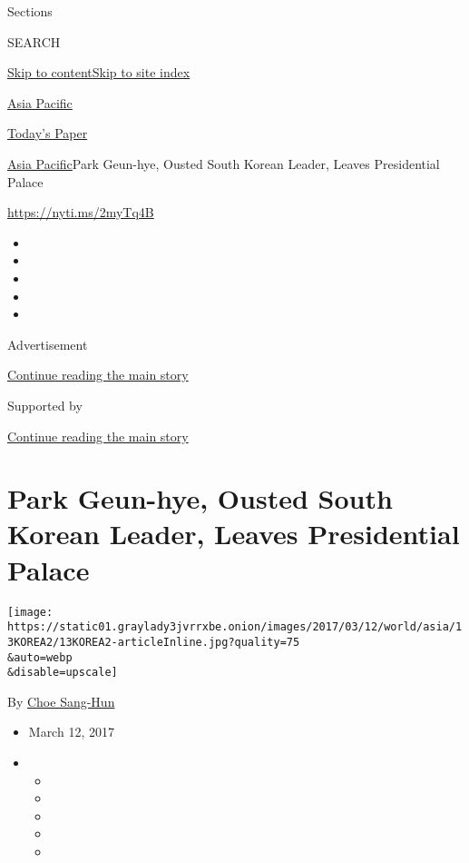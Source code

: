Sections

SEARCH

\protect\hyperlink{site-content}{Skip to
content}\protect\hyperlink{site-index}{Skip to site index}

\href{https://www.nytimes3xbfgragh.onion/section/world/asia}{Asia
Pacific}

\href{https://myaccount.nytimes3xbfgragh.onion/auth/login?response_type=cookie\&client_id=vi}{}

\href{https://www.nytimes3xbfgragh.onion/section/todayspaper}{Today's
Paper}

\href{/section/world/asia}{Asia Pacific}\textbar{}Park Geun-hye, Ousted
South Korean Leader, Leaves Presidential Palace

\url{https://nyti.ms/2myTq4B}

\begin{itemize}
\item
\item
\item
\item
\item
\end{itemize}

Advertisement

\protect\hyperlink{after-top}{Continue reading the main story}

Supported by

\protect\hyperlink{after-sponsor}{Continue reading the main story}

\hypertarget{park-geun-hye-ousted-south-korean-leader-leaves-presidential-palace}{%
\section{Park Geun-hye, Ousted South Korean Leader, Leaves Presidential
Palace}\label{park-geun-hye-ousted-south-korean-leader-leaves-presidential-palace}}

\texttt{[image: https://static01.graylady3jvrrxbe.onion/images/2017/03/12/world/asia/13KOREA2/13KOREA2-articleInline.jpg?quality=75\\\&auto=webp\\\&disable=upscale]}

By \href{http://www.nytimes3xbfgragh.onion/by/choe-sang-hun}{Choe
Sang-Hun}

\begin{itemize}
\item
  March 12, 2017
\item
  \begin{itemize}
  \item
  \item
  \item
  \item
  \item
  \end{itemize}
\end{itemize}

